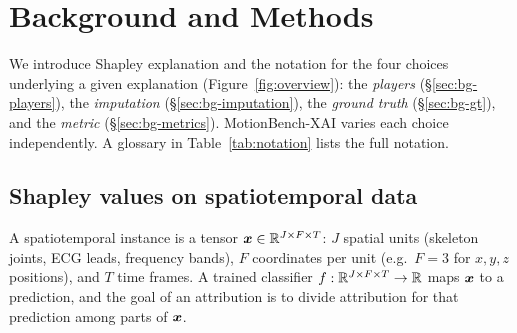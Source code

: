 \section{Background and Methods}
\label{sec:background}

We introduce Shapley explanation and the notation for the four choices underlying a given explanation (Figure~\ref{fig:overview}): the \emph{players} (\S\ref{sec:bg-players}), the \emph{imputation} (\S\ref{sec:bg-imputation}), the \emph{ground truth} (\S\ref{sec:bg-gt}), and the \emph{metric} (\S\ref{sec:bg-metrics}). MotionBench-XAI varies each choice independently. A glossary in Table~\ref{tab:notation} lists the full notation.

\subsection{Shapley values on spatiotemporal data}
\label{sec:bg-shapley}

A spatiotemporal instance is a tensor $\bm{x} \in \mathbb{R}^{J \times F \times T}$:
$J$ spatial units (skeleton joints, ECG leads, frequency bands), $F$ coordinates per unit (e.g.\ $F{=}3$ for $x,y,z$ positions), and $T$ time frames.  A trained classifier $f : \mathbb{R}^{J \times F \times T} \to \mathbb{R}$ maps $\bm{x}$ to a prediction, and the goal of an attribution is
to divide attribution for that prediction among parts of $\bm{x}$.

